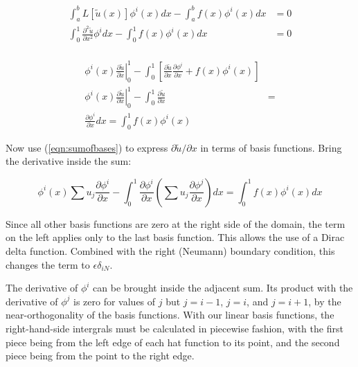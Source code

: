 \documentclass[10pt]{article}
\begin{document}
\begin{equation}
    \begin{split}
        \int_a^b L[\tilde{u}(x)] \phi^i(x) dx - \int_a^b f(x) \phi^i(x) dx &= 0 \\
        \int_0^1{ \frac{\partial^2\tilde{u}}{\partial x^2} \phi^i dx } - \int_0^1 f(x) \phi^i(x) dx &= 0 \\
    \end{split}
\end{equation}


\begin{equation}
    \begin{split}
        \phi^i(x) \left. \frac{\partial \tilde u}{\partial x} \right|_0^1 - \int_0^1 \left[\frac{\partial \tilde u}{\partial x} \frac{\partial \phi^i}{\partial x} + f(x) \phi^i(x)\right] \\
        \phi^i(x) \left. \frac{\partial \tilde u}{\partial x} \right|_0^1 - \int_0^1 \frac{\partial \tilde u}{\partial x} &= \\ \frac{\partial \phi^i}{\partial x} dx = \int_0^1 f(x) \phi^i(x)
    \end{split}
\end{equation}

Now use (\ref{eqn:sumofbases}) to express $\partial \tilde u / \partial x$ in terms of basis functions. Bring the derivative inside the sum:
    
\begin{equation}
    \phi^i(x) \sum u_j \frac{\partial \phi^i}{\partial x} - \int_0^1 \frac{\partial \phi^i}{\partial x} \left( \sum u_j \frac{\partial \phi^j}{\partial x} \right) dx = \int_0^1 f(x) \phi^i(x) dx
\end{equation}

Since all other basis functions are zero at the right side of the domain, the term on the left applies only to the last basis function. This allows the use of a Dirac delta function. Combined with the right (Neumann) boundary condition, this changes the term to $\epsilon \delta_{iN}$.

The derivative of $\phi^i$ can be brought inside the adjacent sum. Its product with the derivative of $\phi^j$ is zero for values of $j$ but $j=i-1$, $j=i$, and $j=i+1$, by the near-orthogonality of the basis functions. With our linear basis functions, the right-hand-side intergrals must be calculated in piecewise fashion, with the first piece being from the left edge of each hat function to its point, and the second piece being from the point to the right edge.
\end{document}
